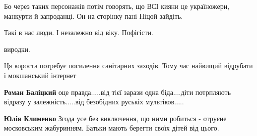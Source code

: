 \begin{itemize}
\begin{itemize}
Бо через таких персонажів потім говорять, що ВСІ кияни це україножери, манкурти
й запроданці. Он на сторінку пані Ніцой зайдіть.

\end{itemize}

 
Такі в нас люди. І незалежно від віку. Пофігісти.

 
виродки.

 
Ця короста потребує посилення санітарних заходів. Тому час найвищий відрубати і
мокшанський інтернет

\begin{itemize}
 
\textbf{Роман Баліцкий} оце правда.....від тієї зарази одна біда....діти потрпляють відразу у залежність.....від безобідних руськіх мультіков.....

 
\textbf{Юлія Клименко}
Згода усе без виключення, що ними робиться - отруєне московським жабуринням. Батьки мають берегти своїх дітей від цього.

 

\end{itemize}
\end{itemize}
